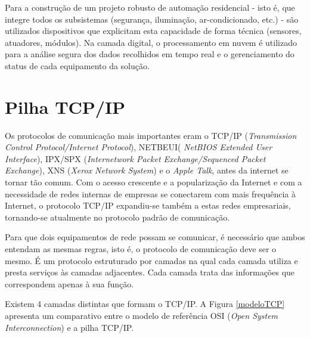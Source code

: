\documentclass[
12pt,
openany, %
oneside, %
a4paper,			
english,			
brazil			        %
]{abntbibufjf}
\begin{document}
    Para a construção de um projeto robusto de automação residencial - isto é, que integre todos os subsistemas (segurança, iluminação, ar-condicionado, etc.) - são utilizados dispositivos que explicitam esta capacidade de forma técnica (sensores, atuadores, módulos). Na camada digital, o processamento em nuvem é utilizado para a análise segura dos dados recolhidos em tempo real e o gerenciamento do status de cada equipamento da solução.
    
	
	\section{Pilha TCP/IP}
	
	Os protocolos de comunicação mais importantes eram o TCP/IP (\textit{Transmission Control Protocol/Internet Protocol}), NETBEUI( \textit{NetBIOS Extended User Interface}), IPX/SPX (\textit{Internetwork Packet Exchange/Sequenced Packet Exchange}), XNS (\textit{Xerox Network System}) e o \textit{Apple Talk}, antes da internet se tornar tão comum. Com o acesso crescente e a popularização da Internet e com a necessidade de redes internas de empresas se conectarem com mais frequência à Internet, o protocolo TCP/IP expandiu-se também a estas redes empresariais, tornando-se atualmente no protocolo padrão de comunicação.
	
	Para que dois equipamentos de rede possam se comunicar, é necessário que ambos entendam as mesmas regras, isto é, o protocolo de comunicação deve ser o mesmo. É um protocolo estruturado por camadas na qual cada camada utiliza e presta serviços às camadas adjacentes. Cada camada trata das informações que correspondem apenas à sua função. \cite{FEUP}
	
	Existem 4 camadas distintas que formam o TCP/IP. A Figura \ref{modeloTCP} apresenta um comparativo entre o modelo de referência OSI (\textit{Open System Interconnection}) e a pilha TCP/IP.
	
	
	
\end{document}
